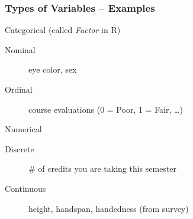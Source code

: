 
\begin{frame}
\frametitle{Types of Variables -- Examples}
\begin{block}{Categorical (called \emph{Factor} in R)}
		\begin{description}
			\item[Nominal] eye color, sex
			\item[Ordinal] course evaluations (0 = Poor, 1 = Fair, \dots)
		\end{description}
\end{block}

\begin{block}{Numerical}
		\begin{description}
			\item[Discrete] \# of credits you are taking this semester 
      \item[Continuous] height, handspan, handedness (from survey) 
		\end{description}
\end{block}

\end{frame}


%


